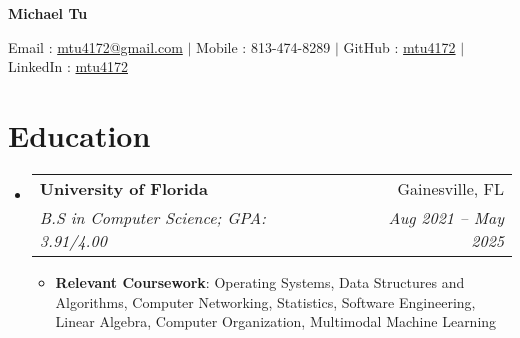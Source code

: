 \documentclass[letterpaper,11pt]{article}
\makeatletter
\newcommand{\resumeItem}[2]{
  \item\small{
    \textbf{#1}{: #2 \vspace{-2pt}}
  }
}
\newcommand{\resumeSubheading}[4]{
  \vspace{-1pt}\item
    \begin{tabular*}{0.97\textwidth}{l@{\extracolsep{\fill}}r}
      \textbf{#1} & #2 \\
      \textit{\small#3} & \textit{\small #4} \\
    \end{tabular*}\vspace{-6pt}
}
\newcommand{\resumeSubHeadingListStart}{\begin{itemize}[leftmargin=*, label={}]}
\newcommand{\resumeSubHeadingListEnd}{\end{itemize}}
\newcommand{\resumeItemListStart}{\begin{itemize}}
\newcommand{\resumeItemListEnd}{\end{itemize}\vspace{-5pt}}
\makeatother
\begin{document}
    \centerline{\textbf{\huge Michael Tu}}\vspace{0.15cm}
    \centerline{Email : \href{mailto:}{mtu4172@gmail.com} $|$
    Mobile : 813-474-8289 $|$
    GitHub : \href{http://github.com/mtu4172}{mtu4172} $|$
    LinkedIn : \href{http://linkedin.com/in/mtu4172}{mtu4172}}

\section{Education}
  \resumeSubHeadingListStart
    \resumeSubheading
      {University of Florida}{Gainesville, FL}
      {B.S in Computer Science; GPA: 3.91/4.00}{Aug 2021 -- May 2025}
    \resumeItemListStart
        \resumeItem{Relevant Coursework}
            {Operating Systems,
            Data Structures and Algorithms,
            Computer Networking, 
            Statistics, 
            Software Engineering, 
            Linear Algebra, 
            Computer Organization,
            Multimodal Machine Learning
            }
    \resumeItemListEnd
  \resumeSubHeadingListEnd

\end{document}
